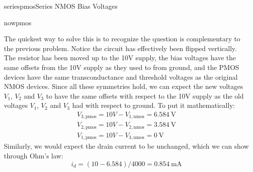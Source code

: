 \begin{mainquestion}{seriespmos}{Series NMOS Bias Voltages}
\begin{partquestion}{nowpmos}
\begin{answer}
The quickest way to solve this is to recognize the question is complementary to the previous problem. Notice the circuit has effectively been flipped vertically. The resistor has been moved up to the 10V supply, the bias voltages have the same offsets from the 10V supply as they used to from ground, and the PMOS devices have the same transconductance and threshold voltages as the original NMOS devices. Since all these symmetries hold, we can expect the new voltages $V_{1}$, $V_2$ and $V_3$ to have the same offsets with respect to the 10V supply as the old voltages $V_1$, $V_2$ and $V_3$ had with respect to ground.
To put it mathematically:
\begin{gather*}
    V_{3,\text{pmos}} = 10V - V_{1,\text{nmos}} = \qty{6.584}{\volt}\\
    V_{2,\text{pmos}} = 10V - V_{2,\text{nmos}} = \qty{3.584}{\volt}\\
    V_{1,\text{pmos}} = 10V - V_{3,\text{nmos}} = \qty{0}{\volt}
\end{gather*}
Similarly, we would expect the drain current to be unchanged, which we can show through Ohm's law:
\[
i_d = (10 - 6.584) / 4000 = \qty{0.854}{\milli\ampere}
\]
\end{answer}
\end{partquestion}

\end{mainquestion}